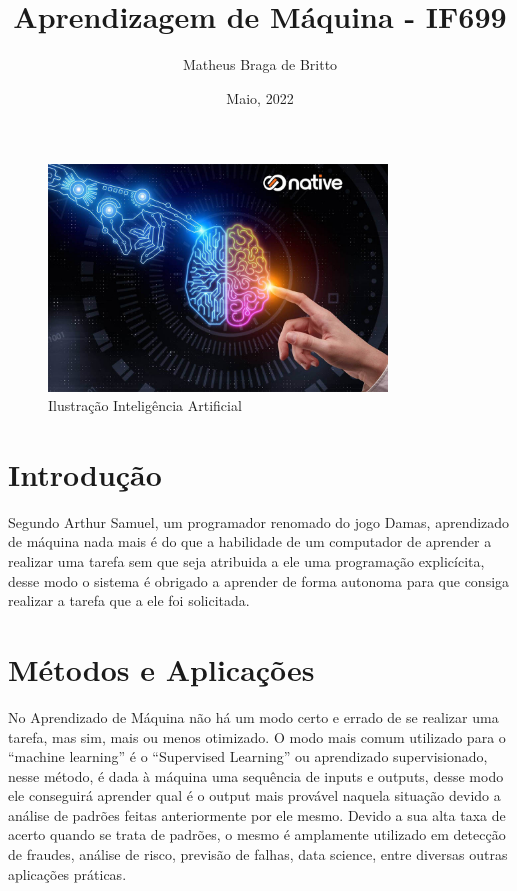 \documentclass[12pt]{article}
\title{Aprendizagem de Máquina - IF699}
\author{Matheus Braga de Britto}
\date{Maio, 2022 }
\begin{document}
 
\maketitle
 
\begin{figure}[h]
    \centering


    \includegraphics[width=90mm]{foto.jpg}
    \caption{Ilustração Inteligência Artificial}


\end{figure}
 
\section{Introdução}

\par 
Segundo Arthur Samuel, um programador renomado do jogo Damas, aprendizado de máquina nada mais é do que a habilidade de um computador de aprender a realizar uma tarefa sem que seja atribuida a ele uma programação explicícita, desse modo o sistema é obrigado a aprender de forma autonoma para que consiga realizar a tarefa que a ele foi solicitada.

 \cite{mahesh2020machine}

\section{Métodos e Aplicações}
\par
No Aprendizado de Máquina não há um modo certo e errado de se realizar uma tarefa, mas sim, mais ou menos otimizado. O modo mais comum utilizado para o “machine learning” é o “Supervised Learning” ou aprendizado supervisionado, nesse método, é dada à máquina uma sequência de inputs e outputs, desse modo ele conseguirá aprender qual é o output mais provável naquela situação devido a análise de padrões feitas anteriormente por ele mesmo. Devido a sua alta taxa de acerto quando se trata de padrões, o mesmo é amplamente utilizado em detecção de fraudes, análise de risco, previsão de falhas, data science, entre diversas outras aplicações práticas.
\end{document}
